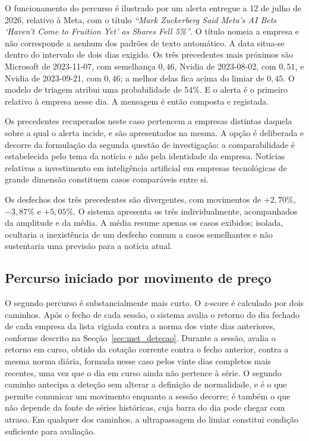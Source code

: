 O funcionamento do percurso é ilustrado por um alerta entregue a 12 de julho de 2026, relativo à
Meta, com o título \emph{``Mark Zuckerberg Said Meta's AI Bets `Haven't Come to Fruition Yet' as
Shares Fell 5\%''}. O título nomeia a empresa e não corresponde a nenhum dos padrões de texto automático. A data
situa-se dentro do intervalo de dois dias exigido. Os três precedentes mais próximos são Microsoft
de 2023-11-07, com semelhança $0{,}46$, Nvidia de 2023-08-02, com $0{,}51$, e Nvidia de
2023-09-21, com $0{,}46$; a melhor delas fica acima do limiar de $0{,}45$. O modelo de triagem
atribui uma probabilidade de $54\%$. E o alerta é o primeiro relativo à empresa nesse dia. A mensagem é então composta e registada.

Os precedentes recuperados neste caso pertencem a empresas distintas daquela sobre a qual o alerta
incide, e são apresentados na mesma. A opção é deliberada e decorre da formulação da segunda
questão de investigação: a comparabilidade é estabelecida pelo tema da notícia e não pela
identidade da empresa. Notícias relativas a investimento em inteligência artificial em empresas
tecnológicas de grande dimensão constituem casos comparáveis entre si.

Os desfechos dos três precedentes são divergentes, com movimentos de $+2{,}70\%$, $-3{,}87\%$ e
$+5{,}05\%$. O sistema apresenta os três individualmente, acompanhados da amplitude e da média.
A média resume apenas os casos exibidos; isolada, ocultaria a inexistência de um desfecho comum
a casos semelhantes e não sustentaria uma previsão para a notícia atual.

\subsection{Percurso iniciado por movimento de preço}

O segundo percurso é substancialmente mais curto. O $z$-score é calculado por dois caminhos. Após o
fecho de cada sessão, o sistema avalia o retorno do dia fechado de cada empresa da lista vigiada
contra a norma dos vinte dias anteriores, conforme descrito na Secção~\ref{sec:met_detecao}. Durante
a sessão, avalia o retorno em curso, obtido da cotação corrente contra o fecho anterior, contra a
mesma norma diária, formada nesse caso pelos vinte dias completos mais recentes, uma vez que o dia
em curso ainda não pertence à série. O segundo caminho antecipa a deteção sem alterar a definição de
normalidade, e é o que permite comunicar um movimento enquanto a sessão decorre; é também o que não
depende da fonte de séries históricas, cuja barra do dia pode chegar com atraso. Em qualquer dos
caminhos, a ultrapassagem do limiar constitui condição suficiente para avaliação.

